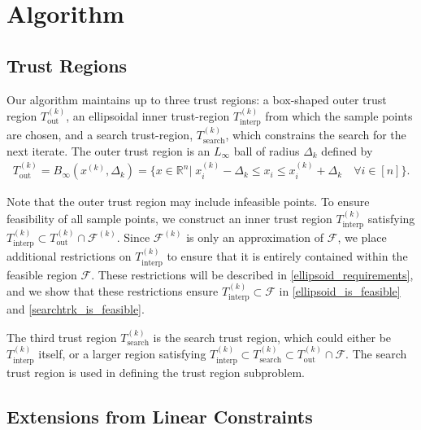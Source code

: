 \documentclass{article}
\theoremstyle{case}
\numberwithin{theorem}{subsection}
\newcommand{\dk}{\Delta_k}
\newcommand{\feasiblek}{{\mathcal F^{(k)}}}
\newcommand{\feasible}{{\mathcal F}}
\newcommand{\outertrk}{{T_{\text{out}}^{(k)}}}
\newcommand{\Rn}{\mathbb R^n}
\newcommand{\sampletrk}{{T_{\text{interp}}^{(k)}}}
\newcommand{\searchtrk}{{T_{\text{search}}^{(k)}}}
\newcommand{\tr}{{ B_{\infty}\left(\xk, \dk\right) }}
\newcommand{\xk}{x^{(k)}}
\newcommand{\replace}[2]{{\color{red}\sout{#1}\color{black}{\color{red}#2\color{black}}}} %
\newcommand{\sbnote}[1]{\textsf{{\color{cyan}{ SCB note:}   #1} }\marginpar{{\textbf{Comment}}}}
\begin{document}
\section{Algorithm}

\subsection{Trust Regions}

Our algorithm maintains up to three trust regions: 
a box-shaped outer trust region $\outertrk$,  an ellipsoidal inner trust-region $\sampletrk$ from which the sample points are chosen,  and a search trust-region, $\searchtrk$, which constrains the search for the next iterate.
The outer trust region is an $L_{\infty}$ ball of radius $ \dk $ defined by
\begin{align}
\outertrk = \tr = \{x\in \Rn | \; \xk_i - \dk \le x_i \le \xk_i + \dk \quad \forall i \in [n]\}. \label{define_outer_trust_region}
\end{align}

Note that the outer trust region may include infeasible points.
To ensure feasibility of all sample points, we construct an inner trust region  $ \sampletrk $  satisfying 
$\sampletrk \subset \outertrk \cap \feasiblek$.
Since $\feasiblek$ is only an approximation of $\feasible$,  we place additional restrictions on $\sampletrk$
to ensure that it is entirely contained within the feasible region $\feasible$.
These restrictions will be described in \cref{ellipsoid_requirements}, 
and we show that these restrictions ensure $\sampletrk \subset \feasible$ in \cref{ellipsoid_is_feasible} and \cref{searchtrk_is_feasible}.


The third trust region $\searchtrk$ is the search trust region, which could either be $\sampletrk$ itself, 
or a larger region satisfying $ \sampletrk \subset \searchtrk \subset \outertrk \cap \feasible$.
The search trust region is used in defining the trust region subproblem.


\subsection{Extensions from Linear Constraints}
\end{document}
